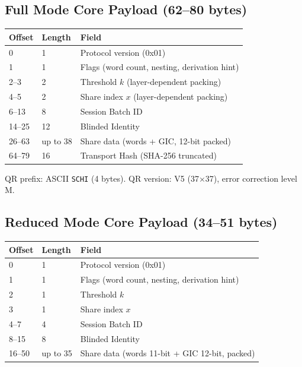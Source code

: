 \documentclass[11pt]{article}
\begin{document}
\subsection{Full Mode Core Payload (62--80 bytes)}

\begin{center}
\small
\begin{tabular}{@{}lll@{}}
\toprule
\textbf{Offset} & \textbf{Length} & \textbf{Field} \\ \midrule
0 & 1 & Protocol version (0x01) \\
1 & 1 & Flags (word count, nesting, derivation hint) \\
2--3 & 2 & Threshold $k$ (layer-dependent packing) \\
4--5 & 2 & Share index $x$ (layer-dependent packing) \\
6--13 & 8 & Session Batch ID \\
14--25 & 12 & Blinded Identity \\
26--63 & up to 38 & Share data (words + GIC, 12-bit packed) \\
64--79 & 16 & Transport Hash (SHA-256 truncated) \\
\bottomrule
\end{tabular}
\end{center}

QR prefix: ASCII \texttt{SCHI} (4 bytes). QR version: V5 (37$\times$37), error correction level M.

\subsection{Reduced Mode Core Payload (34--51 bytes)}

\begin{center}
\small
\begin{tabular}{@{}lll@{}}
\toprule
\textbf{Offset} & \textbf{Length} & \textbf{Field} \\ \midrule
0 & 1 & Protocol version (0x01) \\
1 & 1 & Flags (word count, nesting, derivation hint) \\
2 & 1 & Threshold $k$ \\
3 & 1 & Share index $x$ \\
4--7 & 4 & Session Batch ID \\
8--15 & 8 & Blinded Identity \\
16--50 & up to 35 & Share data (words 11-bit + GIC 12-bit, packed) \\
\bottomrule
\end{tabular}
\end{center}
\end{document}
